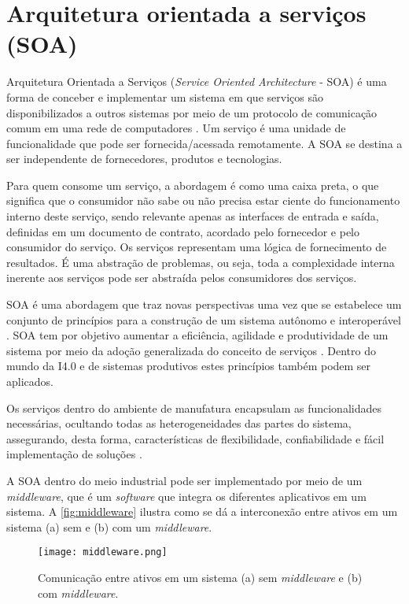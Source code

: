 \section{Arquitetura orientada a serviços (SOA)}
\label{sec:soa}

Arquitetura Orientada a Serviços (\textit{Service Oriented Architecture} - SOA) é uma forma de conceber e implementar um sistema em que serviços são disponibilizados a outros sistemas por meio de um protocolo de comunicação comum em uma rede de computadores \cite{bell2008soa}. Um serviço é uma unidade de funcionalidade que pode ser fornecida/acessada remotamente. A SOA se destina a ser independente de fornecedores, produtos e tecnologias.

Para quem consome um serviço, a abordagem é como uma caixa preta, o que significa que o consumidor não sabe ou não precisa estar ciente do funcionamento interno deste serviço, sendo relevante apenas as interfaces de entrada e saída, definidas em um documento de contrato, acordado pelo fornecedor e pelo consumidor do serviço. Os serviços representam uma lógica de fornecimento de resultados. É uma abstração de problemas, ou seja, toda a complexidade interna inerente aos serviços pode ser abstraída pelos consumidores dos serviços.

SOA é uma abordagem que traz novas perspectivas uma vez que se estabelece um conjunto de princípios para a construção de um sistema autônomo e interoperável \cite{candido2009soa}. SOA tem por objetivo aumentar a eficiência, agilidade e produtividade de um sistema por meio da adoção generalizada do conceito de serviços \cite{souit2013soa}. Dentro do mundo da I4.0 e de sistemas produtivos estes princípios também podem ser aplicados.

Os serviços dentro do ambiente de manufatura encapsulam as funcionalidades necessárias, ocultando todas as heterogeneidades das partes do sistema, assegurando, desta forma, características de flexibilidade, confiabilidade e fácil implementação de	soluções \cite{groba2008soa}.

A SOA dentro do meio industrial pode ser implementado por meio de um \textit{middleware}, que é um \textit{software} que integra os diferentes aplicativos em um sistema. A \autoref{fig:middleware} ilustra como se dá a interconexão entre ativos em um sistema (a) sem e (b) com um \textit{middleware}.

\begin{figure}[htb]
	\centering
	\texttt{[image: middleware.png]}
	\caption{Comunicação entre ativos em um sistema (a) sem \textit{middleware} e (b) com \textit{middleware}.}
	\label{fig:middleware}
\end{figure}

